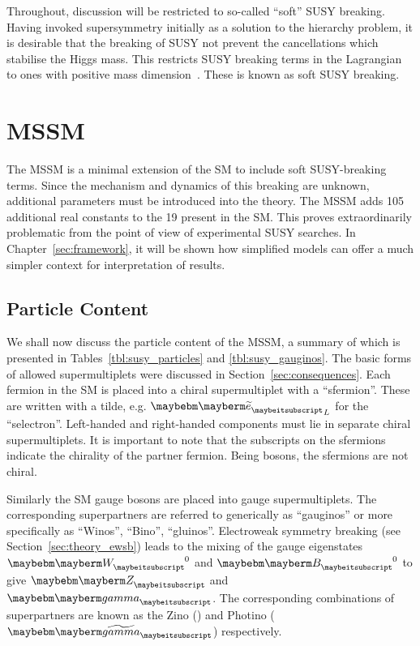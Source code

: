 Throughout, discussion will be restricted to so-called ``soft'' \ac{SUSY}
breaking. Having invoked supersymmetry initially as a solution to the hierarchy
problem, it is desirable that the breaking of \ac{SUSY} not prevent the
cancellations which stabilise the Higgs mass. This restricts \ac{SUSY} breaking
terms in the Lagrangian to ones with positive mass
dimension~\cite{susy_primer}. These is known as soft \ac{SUSY} breaking.


\section{\acl{MSSM}}
The \acl{MSSM} is a minimal extension of the \ac{SM} to include soft
\ac{SUSY}-breaking terms. Since the mechanism and dynamics of this breaking are
unknown, additional parameters must be introduced into the theory. The \ac{MSSM}
adds 105 additional real constants to the 19 present in the \ac{SM}. This proves
extraordinarily problematic from the point of view of experimental \ac{SUSY}
searches. In Chapter~\ref{sec:framework}, it will be shown how simplified models
can offer a much simpler context for interpretation of results.

\subsection{Particle Content}
We shall now discuss the particle content of the \ac{MSSM}, a summary of which
is presented in Tables~\ref{tbl:susy_particles} and \ref{tbl:susy_gauginos}. The
basic forms of allowed supermultiplets were discussed in
Section~\ref{sec:consequences}. Each fermion in the \ac{SM} is placed into a
chiral supermultiplet with a \spinzero ``sfermion''. These are written with a
tilde, e.g. $\PSe_L$ for the ``selectron''. Left-handed and right-handed
components must lie in separate chiral supermultiplets. It is important to note
that the subscripts on the sfermions indicate the chirality of the partner
fermion. Being \spinzero bosons, the sfermions are not chiral.

Similarly the \ac{SM} gauge bosons are placed into gauge supermultiplets. The
corresponding superpartners are referred to generically as ``gauginos'' or more
specifically as ``Winos'', ``Bino'', ``gluinos''. Electroweak symmetry breaking
(see Section~\ref{sec:theory_ewsb}) leads to the mixing of the gauge eigenstates
$\PW^0$ and $\PB^0$ to give $\PZ$ and $\Pphoton$. The corresponding combinations
of superpartners are known as the Zino (\PSZ) and Photino ($\PSphotino$)
respectively.

